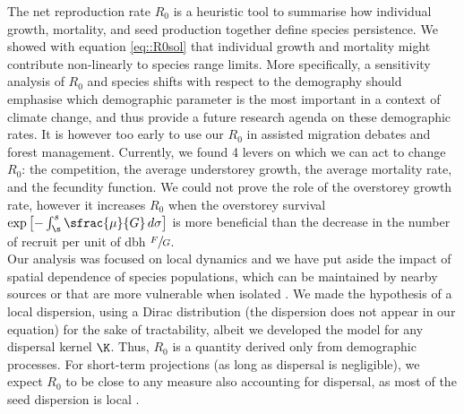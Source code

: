 The net reproduction rate $ R_0 $ is a heuristic tool to summarise how
individual growth, mortality, and seed production together define species
persistence. We showed with equation \eqref{eq::R0sol} that individual growth
and mortality might contribute non-linearly to species range limits. More
specifically, a sensitivity analysis of $ R_0 $ and species shifts with
respect to the demography should emphasise which demographic parameter is the
most important in a context of climate change, and thus provide a future research agenda on these demographic rates.
It is however too early to use our $ R_0 $ in assisted migration debates and forest management.
Currently, we found 4 levers on which we can act to change $ R_0 $: the
competition, the average understorey growth, the average mortality rate, and
the fecundity function. We could not prove the role of the overstorey growth rate, however it increases $ R_0 $ when the overstorey survival $ \exp \left[ -\int_{\s}^{s} \sfrac{\mu}{G} \, d \sigma \right] $ is more beneficial than the decrease in the number of recruit per unit of dbh $ \sfrac{F}{G} $. \\


Our analysis was focused on local dynamics and we have put aside the impact of
spatial dependence of species populations, which can be maintained by nearby
sources or that are more vulnerable when isolated \citep{Pulliam2000}. We made
the hypothesis of a local dispersion, using a Dirac distribution (\ie the
dispersion does not appear in our equation) for the sake of tractability,
albeit we developed the model for any dispersal kernel $ \K $. Thus, $ R_0 $ is a quantity derived only from demographic processes. For short-term projections (\ie as long as dispersal is negligible), we expect $ R_0 $ to be close to any measure also accounting for dispersal, as most of the seed dispersion is local \citep{Nathan2000}.


